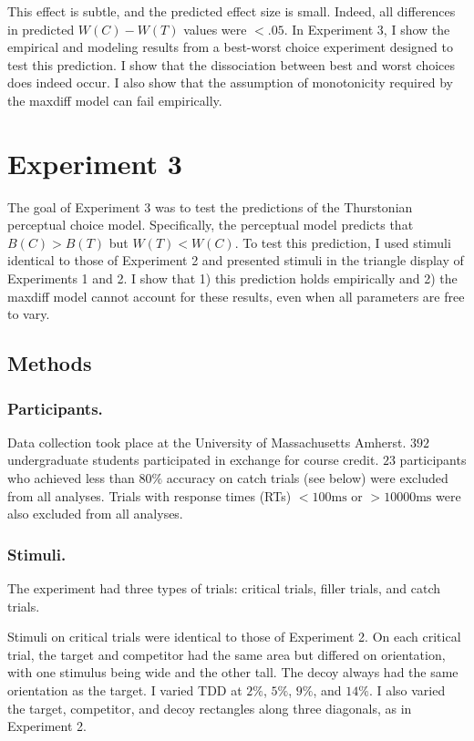 This effect is subtle, and the predicted effect size is small. Indeed, all differences in predicted $W(C)-W(T)$ values were $<.05$. In Experiment 3, I show the empirical and modeling results from a best-worst choice experiment designed to test this prediction. I show that the dissociation between best and worst choices does indeed occur. I also show that the assumption of monotonicity required by the maxdiff model can fail empirically.

\section{Experiment 3}

The goal of Experiment 3 was to test the predictions of the Thurstonian perceptual choice model. Specifically, the perceptual model predicts that $B(C)>B(T)$ but $W(T)<W(C)$. To test this prediction, I used stimuli identical to those of Experiment 2 and presented stimuli in the triangle display of Experiments 1 and 2.
I show that 1) this prediction holds empirically and 2) the maxdiff model cannot account for these results, even when all parameters are free to vary. 

\subsection{Methods}

\subsubsection{Participants.}
Data collection took place at the University of Massachusetts Amherst. $392$ undergraduate students participated in exchange for course credit. $23$ participants who achieved less than $80\%$ accuracy on catch trials (see below) were excluded from all analyses. Trials with response times (RTs) $<100\text{ms}$ or  $>10000\text{ms}$ were also excluded from all analyses.

\subsubsection{Stimuli.}
The experiment had three types of trials: critical trials, filler trials, and catch trials. 

Stimuli on critical trials were identical to those of Experiment 2. On each critical trial, the target and competitor had the same area but differed on orientation, with one stimulus being wide and the other tall. The decoy always had the same orientation as the target. I varied TDD at $2\%$, $5\%$, $9\%$, and $14\%$. I also varied the target, competitor, and decoy rectangles along three diagonals, as in Experiment 2. 

